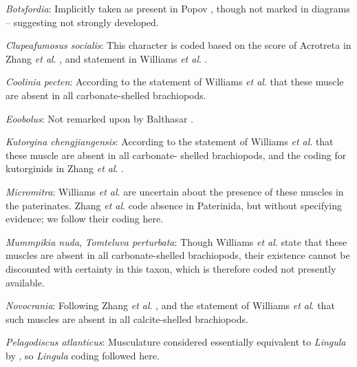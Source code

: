 \documentclass[openany]{book}
\theoremstyle{definition}
\theoremstyle{definition}
\theoremstyle{definition}
\theoremstyle{remark}
\begin{document}
\hypertarget{Botsfordia-coding-81}{}
\emph{Botsfordia}: Implicitly taken as present in Popov
\citeyearpar{Popov1992TheCambrian}, though not marked in diagrams --
suggesting not strongly developed.

\hypertarget{Clupeafumosus_socialis-coding-81}{}
\emph{Clupeafumosus socialis}: This character is coded based on the
score of Acrotreta in Zhang \emph{et al}.
\citeyearpar{Zhang2014Anearly}, and statement in Williams \emph{et al}.
\citeyearpar[P.32]{Williams2000LinguliformeaCraniiformea}.

\hypertarget{Coolinia_pecten-coding-81}{}
\emph{Coolinia pecten}: According to the statement of Williams \emph{et
al}. \citeyearpar[p.~32]{Williams2000LinguliformeaCraniiformea} that
these muscle are absent in all carbonate-shelled brachiopods.

\hypertarget{Eoobolus-coding-81}{}
\emph{Eoobolus}: Not remarked upon by Balthasar
\citeyearpar{Balthasar2009Thebrachiopod}.

\hypertarget{Kutorgina_chengjiangensis-coding-81}{}
\emph{Kutorgina chengjiangensis}: According to the statement of Williams
\emph{et al}. \citeyearpar[p.~32]{Williams2000LinguliformeaCraniiformea}
that these muscle are absent in all carbonate- shelled brachiopods, and
the coding for kutorginids in Zhang \emph{et al}.
\citeyearpar{Zhang2014Anearly}.

\hypertarget{Micromitra-coding-81}{}
\emph{Micromitra}: Williams \emph{et al}.
\citeyearpar[p.~32]{Williams2000LinguliformeaCraniiformea} are uncertain
about the presence of these muscles in the paterinates. Zhang \emph{et
al}. \citeyearpar{Zhang2014Anearly} code absence in Paterinida, but
without specifying evidence; we follow their coding here.

\hypertarget{Mummpikia_nuda-coding-81}{}
\emph{Mummpikia nuda}, \emph{Tomteluva perturbata}: Though Williams
\emph{et al}. \citeyearpar[p.~32]{Williams2000LinguliformeaCraniiformea}
state that these muscles are absent in all carbonate-shelled
brachiopods, their existence cannot be discounted with certainty in this
taxon, which is therefore coded not presently available.

\hypertarget{Novocrania-coding-81}{}
\emph{Novocrania}: Following Zhang \emph{et al}.
\citeyearpar{Zhang2014Anearly}, and the statement of Williams \emph{et
al}. \citeyearpar{Williams2000LinguliformeaCraniiformea} that such
muscles are absent in all calcite-shelled brachiopods.

\hypertarget{Pelagodiscus_atlanticus-coding-81}{}
\emph{Pelagodiscus atlanticus}: Musculature considered essentially
equivalent to \emph{Lingula} by
\citet{Williams2000LinguliformeaCraniiformea}, so \emph{Lingula} coding
followed here.
\end{document}
